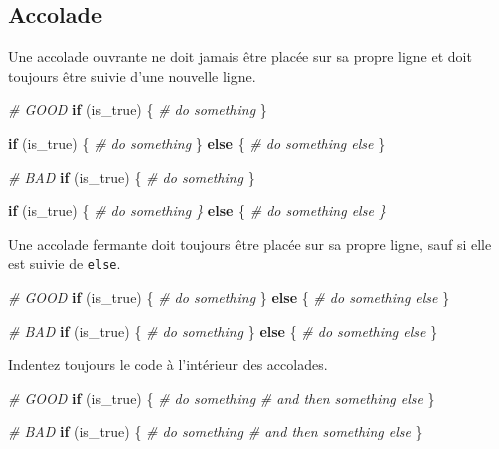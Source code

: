 \documentclass[
  french,
]{scrbook}
\newenvironment{Shaded}{\begin{snugshade}}{\end{snugshade}}
\newcommand{\CommentTok}[1]{\textcolor[rgb]{0.56,0.35,0.01}{\textit{#1}}}
\newcommand{\ControlFlowTok}[1]{\textcolor[rgb]{0.13,0.29,0.53}{\textbf{#1}}}
\newcommand{\NormalTok}[1]{#1}
\begin{document}
\hypertarget{accolade}{%
\subsection{Accolade}\label{accolade}}

Une accolade ouvrante ne doit jamais être placée sur sa propre ligne et doit toujours être suivie d'une nouvelle ligne.

\begin{Shaded}
\begin{Highlighting}[]
\CommentTok{\# GOOD }
\ControlFlowTok{if}\NormalTok{ (is\_true) \{}
  \CommentTok{\# do something}
\NormalTok{\}}

\ControlFlowTok{if}\NormalTok{ (is\_true) \{}
  \CommentTok{\# do something}
\NormalTok{\} }\ControlFlowTok{else}\NormalTok{ \{}
  \CommentTok{\# do something else}
\NormalTok{\}}
    
\CommentTok{\# BAD}
\ControlFlowTok{if}\NormalTok{ (is\_true)}
\NormalTok{\{}
  \CommentTok{\# do something}
\NormalTok{\}}
    
\ControlFlowTok{if}\NormalTok{ (is\_true) \{ }\CommentTok{\# do something \}}
\ControlFlowTok{else}\NormalTok{ \{ }\CommentTok{\# do something else \}}
\end{Highlighting}
\end{Shaded}

Une accolade fermante doit toujours être placée sur sa propre ligne, sauf si elle est suivie de \texttt{else}.

\begin{Shaded}
\begin{Highlighting}[]
\CommentTok{\# GOOD }
\ControlFlowTok{if}\NormalTok{ (is\_true) \{}
  \CommentTok{\# do something}
\NormalTok{\} }\ControlFlowTok{else}\NormalTok{ \{}
  \CommentTok{\# do something else}
\NormalTok{\}}

\CommentTok{\# BAD}
\ControlFlowTok{if}\NormalTok{ (is\_true) \{}
  \CommentTok{\# do something}
\NormalTok{\}}
\ControlFlowTok{else}\NormalTok{ \{}
  \CommentTok{\# do something else }
\NormalTok{\}}
\end{Highlighting}
\end{Shaded}

Indentez toujours le code à l'intérieur des accolades.

\begin{Shaded}
\begin{Highlighting}[]
\CommentTok{\# GOOD }
\ControlFlowTok{if}\NormalTok{ (is\_true) \{}
  \CommentTok{\# do something}
  \CommentTok{\# and then something else}
\NormalTok{\}}

\CommentTok{\# BAD}
\ControlFlowTok{if}\NormalTok{ (is\_true) \{}
  \CommentTok{\# do something}
  \CommentTok{\# and then something else}
\NormalTok{\}}
\end{Highlighting}
\end{Shaded}
\end{document}
